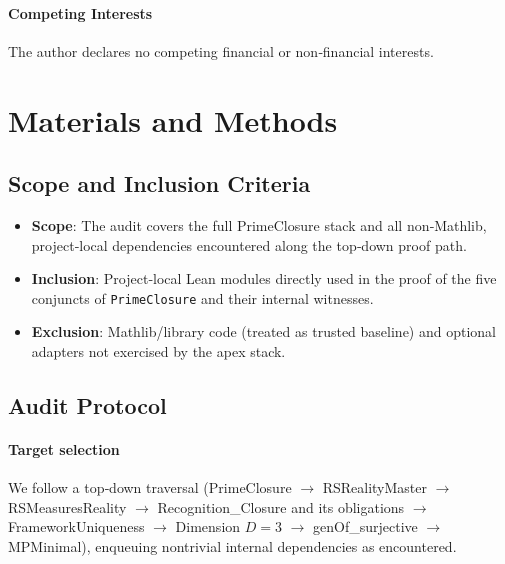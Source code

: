 \documentclass{article}
\begin{document}
\paragraph{Competing Interests}
The author declares no competing financial or non‑financial interests.

\section{Materials and Methods}
\subsection{Scope and Inclusion Criteria}
\begin{itemize}[leftmargin=*]
  \item \textbf{Scope}: The audit covers the full PrimeClosure stack and all non‑Mathlib, project‑local dependencies encountered along the top‑down proof path.
  \item \textbf{Inclusion}: Project‑local Lean modules directly used in the proof of the five conjuncts of \texttt{PrimeClosure} and their internal witnesses.
  \item \textbf{Exclusion}: Mathlib/library code (treated as trusted baseline) and optional adapters not exercised by the apex stack.
\end{itemize}

\subsection{Audit Protocol}
\paragraph{Target selection} We follow a top‑down traversal (PrimeClosure \(\to\) RSRealityMaster \(\to\) RSMeasuresReality \(\to\) Recognition\_Closure and its obligations \(\to\) FrameworkUniqueness \(\to\) Dimension \(D=3\) \(\to\) genOf\_surjective \(\to\) MPMinimal), enqueuing nontrivial internal dependencies as encountered.
\end{document}
